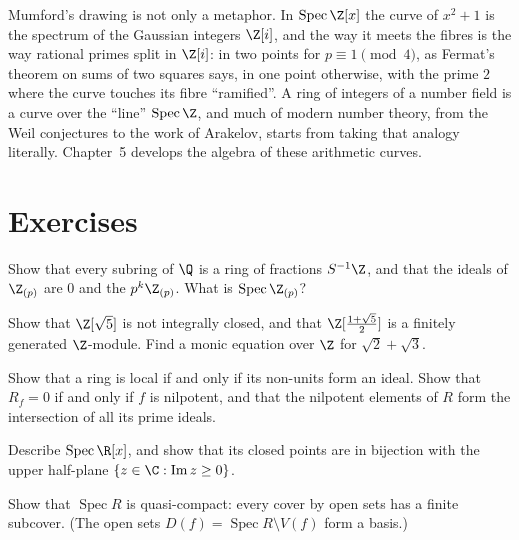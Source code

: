 \begin{beauty}
Mumford's drawing is not only a metaphor. In $\operatorname{Spec}\Z[x]$ the curve of $x^2+1$ is the spectrum of the Gaussian integers $\Z[i]$, and the way it meets the fibres is the way rational primes split in $\Z[i]$: in two
points for $p\equiv1\pmod4$, as Fermat's theorem on sums of two squares says, in one point otherwise, with the prime $2$ where the curve touches its fibre ``ramified''. A ring of integers of a number field is a curve over the
``line'' $\operatorname{Spec}\Z$, and much of modern number theory, from the Weil conjectures to the work of Arakelov, starts from taking that analogy literally. Chapter~5 develops the algebra of these arithmetic curves.
\end{beauty}

\section{Exercises}

\begin{exercise}[$\star$]\label{ex:subringsq}
Show that every subring of $\Q$ is a ring of fractions $S^{-1}\Z$, and that the ideals of $\Z_{(p)}$ are $0$ and the $p^k\Z_{(p)}$. What is $\operatorname{Spec}\Z_{(p)}$?
\end{exercise}

\begin{exercise}[$\star$]\label{ex:golden}
Show that $\Z[\sqrt5]$ is not integrally closed, and that $\Z[\frac{1+\sqrt5}2]$ is a finitely generated $\Z$-module. Find a monic equation over $\Z$ for $\sqrt2+\sqrt3$.
\end{exercise}

\begin{exercise}[$\star\star$]\label{ex:localiff}
Show that a ring is local if and only if its non-units form an ideal. Show that $R_f=0$ if and only if $f$ is nilpotent, and that the nilpotent elements of $R$ form the intersection of all its prime ideals.
\end{exercise}

\begin{exercise}[$\star\star$]\label{ex:specrx}
Describe $\operatorname{Spec}\R[x]$, and show that its closed points are in bijection with the upper half-plane $\{z\in\C:\operatorname{Im}z\ge0\}$.
\end{exercise}

\begin{exercise}[$\star\star$]\label{ex:quasicompact}
Show that $\operatorname{Spec}R$ is quasi-compact: every cover by open sets has a finite subcover. (The open sets $D(f)=\operatorname{Spec}R\setminus V(f)$ form a basis.)
\end{exercise}

